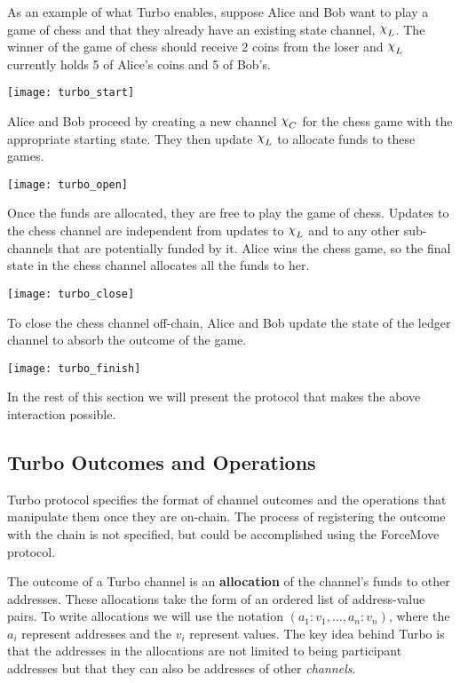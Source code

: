 \documentclass{article}
\begin{document}
As an example of what Turbo enables, suppose Alice and Bob want to play a game of chess and that
they already have an existing state channel, $\rchi_L$.
The winner of the game of chess should receive 2 coins from the loser and $\rchi_L$ currently holds
5 of Alice's coins and 5 of Bob's.

\begin{center}
  \texttt{[image: turbo\_start]} %
\end{center}

Alice and Bob proceed by creating a new channel $\rchi_C$ for the chess game with the appropriate starting state.
They then update $\rchi_L$ to allocate funds to these games.

\begin{center}
  \texttt{[image: turbo\_open]} %
\end{center}

Once the funds are allocated, they are free to play the game of chess.
Updates to the chess channel are independent from updates to $\rchi_L$ and to
any other sub-channels that are potentially funded by it. 
Alice wins the chess game, so the final state in the chess channel allocates all the
funds to her.

\begin{center}
  \texttt{[image: turbo\_close]} %
\end{center}

To close the chess channel off-chain, Alice and Bob update the state of the ledger channel to absorb the outcome of the game.

\begin{center}
  \texttt{[image: turbo\_finish]} %
\end{center}

In the rest of this section we will present the protocol that makes the above interaction
possible.

\subsection{Turbo Outcomes and Operations}

Turbo protocol specifies the format of channel outcomes and the operations that
manipulate them once they are on-chain.
The process of registering the outcome with the chain is not specified, but could be accomplished
using the ForceMove protocol.

The outcome of a Turbo channel is an \textbf{allocation} of the channel's funds to other addresses.
These allocations take the form of an ordered list of address-value pairs.
To write allocations we will use the notation $(a_1{:}v_1, \dots, a_n{:}v_n)$, where the $a_i$
represent addresses and the $v_i$ represent values.
The key idea behind Turbo is that the addresses in the allocations are not limited to being
participant addresses but that they can also be addresses of other \textit{channels}.
\end{document}
